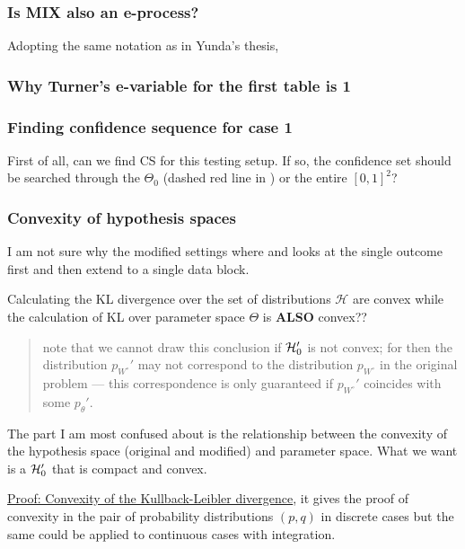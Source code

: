 \subsubsection{Is MIX also an e-process?}

Adopting the same notation as in Yunda's thesis,

\subsubsection{Why Turner's e-variable for the first table is 1}


\subsubsection{Finding confidence sequence for case 1}
First of all, can we find CS for this testing setup.
If so, the confidence set should be searched through the $\Theta_0$
(dashed red line in ) or the entire $[0,1]^2$?

\subsubsection{Convexity of hypothesis spaces}

I am not sure why the modified settings where \cite{turnerExactAnytimevalidConfidence2023} and \cite{turnerGenericEvariablesExact2024} looks at the single outcome first and then extend to a single data block.

Calculating the KL divergence over the set of distributions $\mathcal{H}$ are convex while the calculation of KL over parameter space $\Theta$ is \textbf{ALSO} convex??

\begin{quote}
	note that we cannot draw this conclusion if $\mathcal{H}_0'$ is not convex; for then the distribution $p_{W^\circ}'$ may not correspond to the distribution $p_{W^\circ}$ in the original problem — this correspondence is only guaranteed if $p_{W^\circ}'$ coincides with some $p_{\theta}'$.
\end{quote}

The part I am most confused about is the relationship between the convexity of the hypothesis space (original and modified) and parameter space. What we want is a $\mathcal{H}_0'$ that is compact and convex.

\href{https://statproofbook.github.io/P/kl-conv.html}{Proof: Convexity of the Kullback-Leibler divergence}, it gives the proof of convexity in the pair of probability distributions $(p, q)$ in discrete cases but the same could be applied to continuous cases with integration.

